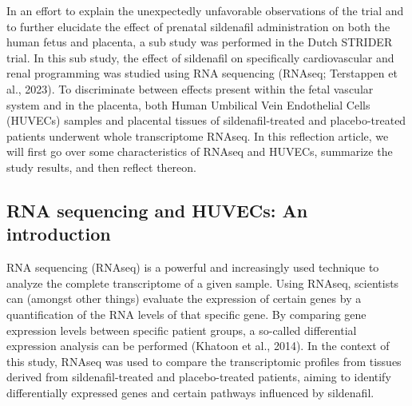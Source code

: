 \documentclass[authordate, reflection,issue]{jote-new-article}
\begin{document}
	In an effort to explain the unexpectedly unfavorable observations of the trial and to further elucidate the effect of prenatal sildenafil administration on both the human fetus and placenta, a sub study was performed in the Dutch STRIDER trial. In this sub study, the effect of sildenafil on specifically cardiovascular and renal programming was studied using RNA sequencing (RNAseq; Terstappen et al., 2023). To discriminate between effects present within the fetal vascular system and in the placenta, both Human Umbilical Vein Endothelial Cells (HUVECs) samples and placental tissues of sildenafil-treated and placebo-treated patients underwent whole transcriptome RNAseq. In this reflection article, we will first go over some characteristics of RNAseq and HUVECs, summarize the study results, and then reflect thereon.







	\subsection{RNA sequencing and HUVECs: An introduction}



	RNA sequencing (RNAseq) is a powerful and increasingly used technique to analyze the complete transcriptome of a given sample. Using RNAseq, scientists can (amongst other things) evaluate the expression of certain genes by a quantification of the RNA levels of that specific gene. By comparing gene expression levels between specific patient groups, a so-called differential expression analysis can be performed (Khatoon et al., 2014). In the context of this study, RNAseq was used to compare the transcriptomic profiles from tissues derived from sildenafil-treated and placebo-treated patients, aiming to identify differentially expressed genes and certain pathways influenced by sildenafil.
\end{document}
